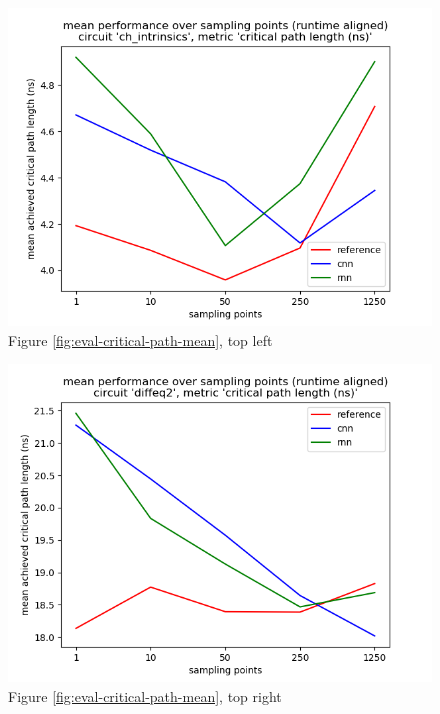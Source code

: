 \begin{figure}[H]
	\includegraphics[width=\linewidth]{plots/eval-ch_intrinsics-critical-path-mean-full.png}
	\caption{Figure \ref{fig:eval-critical-path-mean}, top left}
\end{figure}

\begin{figure}[H]
	\includegraphics[width=\linewidth]{plots/eval-diffeq2-critical-path-mean-full.png}
	\caption{Figure \ref{fig:eval-critical-path-mean}, top right}
\end{figure}

